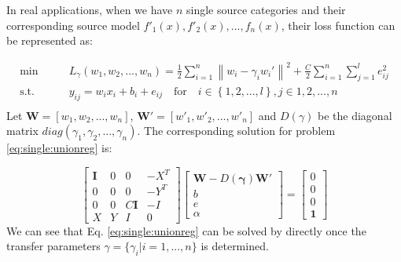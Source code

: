 In real applications, when we have $n$ single source categories and their corresponding source model $f'_1(x),f'_2(x),...,f_n(x)$, their loss function can be represented as:

\begin{equation}\label{eq:single:unionreg}
\begin{aligned}
\min \qquad& L_{\gamma}(w_1,w_2,...,w_n) = \frac{1}{2}\sum\limits_{i = 1}^n{\left\| {w_i}-\gamma_i w_i' \right\|^2} + \frac{C}{2}\sum\limits_{i = 1}^n\sum\limits_{j = 1}^l {{e_{ij} ^2}}\\
\text{s.t.}\qquad& {y_{ij}} = {w_i} {{x_i}} + b_i + {e _{ij}} \quad   \text{for} \quad i \in \left\{ {1,2,...,l}  \right\}, j \in {1,2,...,n}\\
\end{aligned}
\end{equation}
Let $\mathbf{W} = [w_1,w_2,...,w_n]$, $\mathbf{W'} = [w'_1,w'_2,...,w'_n]$ and $D(\gamma)$ be the diagonal matrix $diag(\gamma_1,\gamma_2,...,\gamma_n)$. The corresponding solution for problem \eqref{eq:single:unionreg} is:

\begin{equation}
\left[\begin{array}{cccc}
\mathbf{I}&0&0&-X^T\\
0&0&0&-Y^T\\
0&0&C\mathbf{I}&-I\\
X&Y&I&0
\end{array}\right]
\left[\begin{array}{c}\mathbf{W}- D(\mathbf{\gamma}) \mathbf{W'}\\b\\e\\\alpha
\end{array}\right]	= \left[\begin{array}{c}0\\0\\0\\\mathbf{1}
\end{array}\right]
\end{equation} 
 We can see that Eq. \eqref{eq:single:unionreg} can be solved by directly once the transfer parameters $\gamma=\{\gamma_i|i=1,...,n\}$ is determined.



